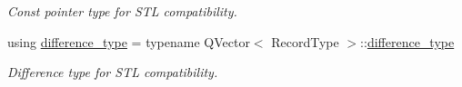 \begin{DoxyCompactItemize}
\begin{DoxyCompactList}\small\item\em Const pointer type for S\+TL compatibility. \end{DoxyCompactList}\item 
using \hyperlink{class_mdt_1_1_plain_text_1_1_record_list_template_a93665d213efef18c64b3470164f8e57d}{difference\+\_\+type} = typename Q\+Vector$<$ Record\+Type $>$\+::\hyperlink{class_mdt_1_1_plain_text_1_1_record_list_template_a93665d213efef18c64b3470164f8e57d}{difference\+\_\+type}\hypertarget{class_mdt_1_1_plain_text_1_1_record_list_template_a93665d213efef18c64b3470164f8e57d}{}\label{class_mdt_1_1_plain_text_1_1_record_list_template_a93665d213efef18c64b3470164f8e57d}

\begin{DoxyCompactList}\small\item\em Difference type for S\+TL compatibility. \end{DoxyCompactList}\end{DoxyCompactItemize}
